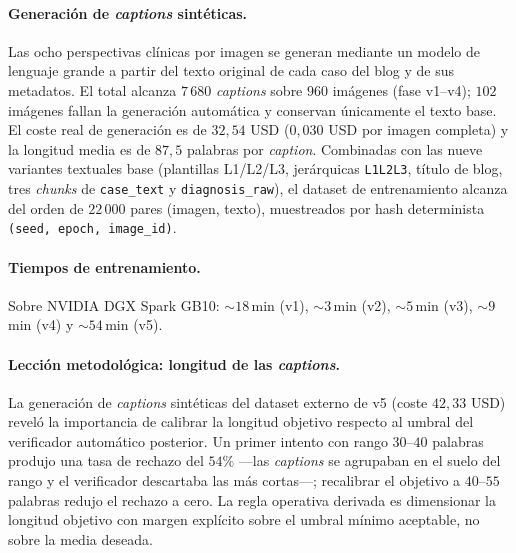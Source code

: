 \paragraph{Generación de \emph{captions} sintéticas.}
Las ocho perspectivas clínicas por imagen se generan mediante un
modelo de lenguaje grande a partir del texto original de cada caso
del blog y de sus metadatos. El total alcanza $7\,680$
\emph{captions} sobre $960$ imágenes (fase v1--v4); $102$ imágenes
fallan la generación automática y conservan únicamente el texto
base. El coste real de generación es de $32{,}54$ USD ($0{,}030$ USD
por imagen completa) y la longitud media es de $87{,}5$ palabras por
\emph{caption}. Combinadas con las nueve variantes textuales base
(plantillas L1/L2/L3, jerárquicas \texttt{L1L2L3}, título de blog,
tres \emph{chunks} de \texttt{case\_text} y \texttt{diagnosis\_raw}),
el dataset de entrenamiento alcanza del orden de $22\,000$ pares
(imagen, texto), muestreados por hash determinista
\texttt{(seed, epoch, image\_id)}.

\paragraph{Tiempos de entrenamiento.}
Sobre NVIDIA DGX Spark GB10: $\sim 18$\,min (v1), $\sim 3$\,min
(v2), $\sim 5$\,min (v3), $\sim 9$\,min (v4) y $\sim 54$\,min (v5).

\paragraph{Lección metodológica: longitud de las \emph{captions}.}
La generación de \emph{captions} sintéticas del dataset externo de
v5 (coste $42{,}33$ USD) reveló la importancia de calibrar la
longitud objetivo respecto al umbral del verificador automático
posterior. Un primer intento con rango $30$--$40$ palabras produjo
una tasa de rechazo del $54\%$ ---las \emph{captions} se agrupaban
en el suelo del rango y el verificador descartaba las más cortas---;
recalibrar el objetivo a $40$--$55$ palabras redujo el rechazo a
cero. La regla operativa derivada es dimensionar la longitud
objetivo con margen explícito sobre el umbral mínimo aceptable, no
sobre la media deseada.

